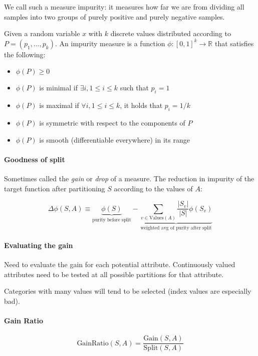 \documentclass{idc_msc}
\begin{document}
We call such a measure impurity: it measures how far we are from dividing all samples into two groups of purely positive and purely negative samples.

Given a random variable \(x\) with \(k\) discrete values distributed according to \(P = (p_1,\ldots,p_k)\).
An impurity measure is a function \(\phi : [0,1]^k \to \mathbb{R}\) that satisfies the following:

\begin{itemize}
  \item \(\phi(P) \ge 0\)
  \item \(\phi(P)\) is minimal if \(\exists i, 1 \le i \le k\) such that \(p_i = 1\)
  \item \(\phi(P)\) is maximal if \(\forall i, 1 \le i \le k\), it holds that \(p_i = 1/k\)
  \item \(\phi(P)\) is symmetric with respect to the components of \(P\)
  \item \(\phi(P)\) is smooth (differentiable everywhere) in its range
\end{itemize}

\paragraph{Goodness of split}

Sometimes called the \emph{gain} or \emph{drop} of a measure.
The reduction in impurity of the target function after partitioning \(S\) according to the values of \(A\):

\[\Delta \phi (S, A) \equiv \underbrace{\phi(S)}_{\text{purity before split}} - \underbrace{\sum_{v \in \text{Values}(A)} \frac{|S_v|}{|S|} \phi(S_v)}_{\text{weighted avg of purity after split}}\]

\paragraph{Evaluating the gain}

Need to evaluate the gain for each potential attribute.
Continuously valued attributes need to be tested at all possible partitions for that attribute.

Categories with many values will tend to be selected (index values are especially bad).

\paragraph{Gain Ratio}

\[\text{GainRatio}(S,A) = \frac{\text{Gain}(S,A)}{\text{Split}(S,A)}\]
\end{document}
